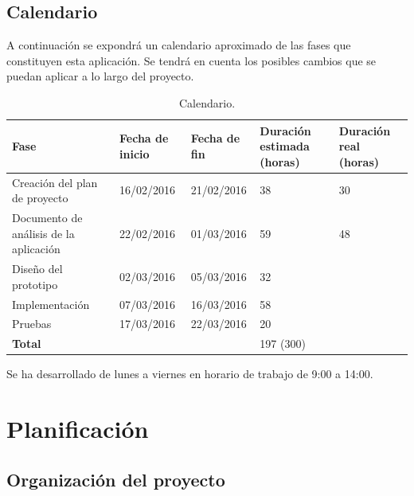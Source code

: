 \documentclass[a4paper,11pt, twoside]{article}
\begin{document}
\subsection{Calendario}
A continuación se expondrá un calendario aproximado de las fases que constituyen esta aplicación. Se tendrá en cuenta los posibles cambios que se puedan aplicar a lo largo del proyecto.
\begin{table}[!h]
 \centering
\begin{tabular}{|M{2.65cm}|M{2.65cm}|M{2.65cm}|M{2.65cm}|M{2.65cm}|}
 \hline
 \textbf{\large Fase} & \textbf{\large Fecha de inicio} & \textbf{\large Fecha de fin} & \textbf{\large Duración estimada (horas) } & \textbf{\large Duración real (horas)} \\\hline
    Creación del plan de proyecto & 16/02/2016 & 21/02/2016 & 38 & 30 \\
        \hline
        Documento de análisis de la aplicación & 22/02/2016 & 01/03/2016 & 59 & 48 \\
        \hline
        Diseño del prototipo & 02/03/2016 & 05/03/2016 & 32 &  \\
        \hline
        Implementación & 07/03/2016 & 16/03/2016 & 58 &  \\
        \hline
        Pruebas & 17/03/2016 & 22/03/2016 & 20 &  \\
        \hline
        \textbf{\large Total} & {\large}  &{\large} & {\large 197 (300) } & {\large} \\
        \hline
\end{tabular}
        \caption{Calendario.}
		\label{ta:cal}
\end{table}

Se ha desarrollado de lunes a viernes en horario de trabajo de 9:00 a 14:00.

\section{Planificación}
\subsection{Organización del proyecto}
\end{document}
